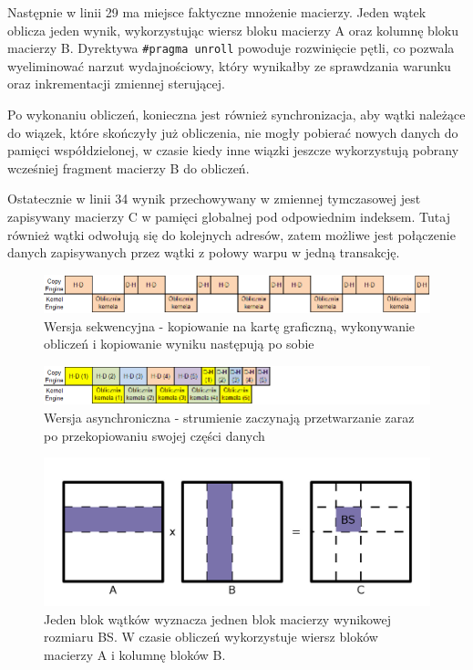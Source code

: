 \documentclass[12pt,a4paper]{article}
\begin{document}
Następnie w linii 29 ma miejsce faktyczne mnożenie macierzy. Jeden wątek oblicza jeden wynik, wykorzystując wiersz bloku macierzy A oraz kolumnę bloku macierzy B. Dyrektywa \verb|#pragma unroll| powoduje rozwinięcie pętli, co pozwala wyeliminować narzut wydajnościowy, który wynikałby ze sprawdzania warunku oraz inkrementacji zmiennej sterującej.

Po wykonaniu obliczeń, konieczna jest również synchronizacja, aby wątki należące do wiązek, które skończyły już obliczenia, nie mogły pobierać nowych danych do pamięci współdzielonej, w czasie kiedy inne wiązki jeszcze wykorzystują pobrany wcześniej fragment macierzy B do obliczeń.

Ostatecznie w linii 34 wynik przechowywany w zmiennej tymczasowej jest zapisywany macierzy C w pamięci globalnej pod odpowiednim indeksem. Tutaj również wątki odwołują się do kolejnych adresów, zatem możliwe jest połączenie danych zapisywanych przez wątki z połowy warpu w jedną transakcję.\\

\begin{figure}
  \includegraphics[width=\linewidth]{images/sync.png}
  \caption{Wersja sekwencyjna - kopiowanie na kartę graficzną, wykonywanie obliczeń i kopiowanie wyniku następują po sobie}
  \label{fig:seq}
\end{figure}

\begin{figure}
  \includegraphics[width=\linewidth]{images/async.png}
  \caption{Wersja asynchroniczna - strumienie zaczynają przetwarzanie zaraz po przekopiowaniu swojej części danych}
  \label{fig:async}
\end{figure}

\begin{figure}
  \includegraphics[width=\linewidth]{images/1.jpg}
  \caption{Jeden blok wątków wyznacza jednen blok macierzy wynikowej rozmiaru BS. W czasie obliczeń wykorzystuje wiersz bloków macierzy A i kolumnę bloków B.}
  \label{fig:matrix1}
\end{figure}
\end{document}
